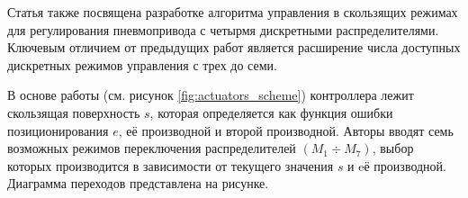 Статья \cite*{Hodgson:article1} также посвящена разработке алгоритма управления в скользящих режимах
для регулирования пневмопривода
с четырмя дискретными распределителями.
Ключевым отличием от предыдущих работ является расширение числа доступных дискретных режимов управления
с трех до семи.

В основе работы (см. рисунок \ref*{fig:actuators_scheme}) контроллера лежит скользящая поверхность $s$, которая определяется как функция ошибки позиционирования $e$,
её производной и второй производной. Авторы вводят семь возможных режимов переключения распределителей $(M_1 \div M_7)$,
выбор которых производится в зависимости от текущего значения $s$ и eё производной. Диаграмма переходов
представлена на рисунке.

\begin{figure}[ht]
\end{figure}
